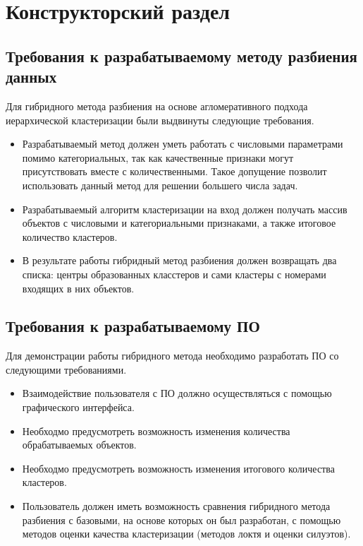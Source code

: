 \chapter{Конструкторский раздел}

\section{Требования к разрабатываемому методу разбиения данных}

Для гибридного метода разбиения на основе агломеративного подхода иерархической кластеризации были выдвинуты следующие требования.
\begin{itemize}
    \item Разрабатываемый метод должен уметь работать с числовыми параметрами помимо категориальных, так как качественные признаки могут присутствовать вместе с количественными. Такое допущение позволит использовать данный метод для решении большего числа задач.
    \item Разрабатываемый алгоритм кластеризации на вход должен получать массив объектов с числовыми и категориальными признаками, а также итоговое количество кластеров.
    \item В результате работы гибридный метод разбиения должен возвращать два списка: центры образованных класстеров и сами кластеры с номерами входящих в них объектов.
\end{itemize}

\section{Требования к разрабатываемому ПО}

Для демонстрации работы гибридного метода необходимо разработать ПО со следующими требованиями.
\begin{itemize}
    \item Взаимодействие пользователя с ПО должно осуществляться с помощью графического интерфейса.
    \item Необходмо предусмотреть возможность изменения количества обрабатываемых объектов.
    \item Необходмо предусмотреть возможность изменения итогового количества кластеров.
    \item Пользователь должен иметь возможность сравнения гибридного метода разбиения с базовыми, на основе которых он был разработан, с помощью методов оценки качества кластеризации (методов локтя и оценки силуэтов).
\end{itemize}

